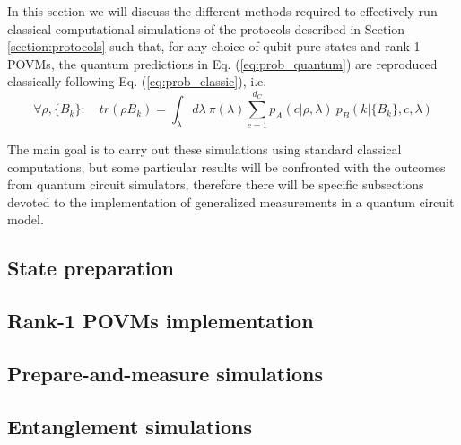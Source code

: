 In this section we will discuss the different methods required to effectively run classical computational simulations of the protocols described in Section \ref{section:protocols} such that, for any choice of qubit pure states and rank-1 POVMs, the quantum predictions in Eq. (\ref{eq:prob_quantum}) are reproduced classically following Eq. (\ref{eq:prob_classic}), i.e.
\begin{equation}
\forall \rho, \{B_{k}\}:\quad tr(\rho B_{k}) = \int_{\lambda} d\lambda\ \pi(\lambda) \sum_{c=1}^{d_C} p_A(c|\rho, \lambda)\ p_B(k|\{B_{k}\}, c, \lambda)    
\end{equation}

The main goal is to carry out these simulations using standard classical computations, but some particular results will be confronted with the outcomes from quantum circuit simulators, therefore there will be specific subsections devoted to the implementation of generalized measurements in a quantum circuit model. 
\subsection{State preparation}

\subsection{Rank-1 POVMs implementation}

\subsection{Prepare-and-measure simulations}

\subsection{Entanglement simulations}
